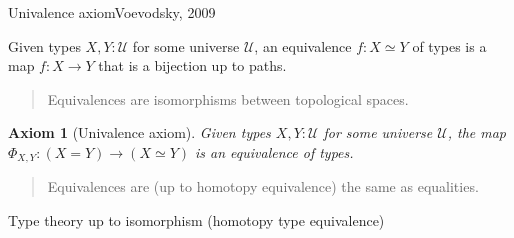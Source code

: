 \documentclass[english]{beamer}
\newtheorem{axiom}[theorem]{Axiom}
\begin{document}





\begin{frame}{Univalence axiom}{Voevodsky, 2009}


\begin{definition}
 Given types $X,Y : \mathcal{U}$ for some universe $\mathcal{U}$, an equivalence $f: X \simeq Y $ of types is a map $f : X \rightarrow Y$ that is a bijection up to paths.
\end{definition}

\begin{quotation}
Equivalences are isomorphisms between topological spaces.
\end{quotation}

\begin{axiom}[Univalence axiom] 
 Given types $X,Y : \mathcal{U}$ for some universe $\mathcal{U}$, the map \(\Phi_{X,Y}: (X=Y) \rightarrow (X \simeq Y)\) is an equivalence of types. 
\end{axiom}

\begin{quotation}
  Equivalences are (up to homotopy equivalence) the same as equalities.
\end{quotation}

Type theory up to isomorphism (homotopy type equivalence)
\end{frame}
\end{document}
